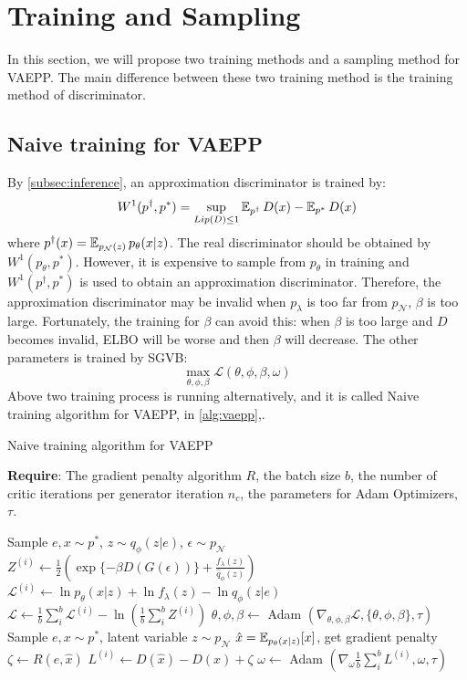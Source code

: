 \section{Training and Sampling}\label{sec:vaepp}
In this section, we will propose two training methods and a sampling method for VAEPP. The main difference between these two training method is the training method of discriminator. 

\subsection{Naive training for VAEPP} \label{subsec:naive_vaepp}
By \cref{subsec:inference}, an approximation discriminator is trained by:
\begin{equation*}
	W^1(p^\dag, p^*) = \sup_{Lip(D) \leq 1} \operatorname{\mathbb{E}}_{p^\dag} D(x) - \operatorname{\mathbb{E}}_{p^*} D(x)
\end{equation*} 
where $p^\dag(x) = \operatorname{\mathbb{E}}_{p_\mathcal{N}(z)} p_\theta(x|z)$. The real discriminator should be obtained by $W^1(p_\theta, p^*)$. However, it is expensive to sample from $p_\theta$ in training and $W^1(p^\dag, p^*)$ is used to obtain an approximation discriminator. Therefore, the approximation discriminator may be invalid when $p_\lambda$ is too far from $p_\mathcal{N}$, \IE $\beta$ is too large. Fortunately, the training for $\beta$ can avoid this: when $\beta$ is too large and $D$ becomes invalid, ELBO will be worse and then $\beta$ will decrease. The other parameters is trained by SGVB:
\begin{equation*}
	\max_{\theta, \phi, \beta} \mathcal{L}(\theta, \phi, \beta, \omega)
\end{equation*}
Above two training process is running alternatively, and it is called Naive training algorithm for VAEPP, in \cref{alg:vaepp},. 
\begin{algorithm}[tb]
\caption{Naive training algorithm for VAEPP}
\label{alg:vaepp}
\textbf{Require}: The gradient penalty algorithm $R$, the batch size $b$, the number of critic iterations per generator iteration $n_c$, the parameters for Adam Optimizers, $\tau$. 

\begin{algorithmic}[1] %
\STATE Sample $e, x \sim p^*$, $z \sim q_\phi(z|e)$, $\epsilon \sim p_\mathcal{N}$
\STATE $Z^{(i)} \gets \frac{1}{2}(\exp\{-\beta D(G(\epsilon))\} + \frac{f_\lambda(z)}{\hat{q}_\phi(z)})$
\STATE $\mathcal{L}^{(i)} \gets \ln p_\theta(x|z) + \ln f_\lambda(z) - \ln q_\phi(z|e)$
\ENDFOR
\STATE $\mathcal{L} \gets \frac{1}{b}\sum_{i}^b \mathcal{L}^{(i)} - \ln (\frac{1}{b}\sum_{i}^b Z^{(i)})$
\STATE $\theta, \phi, \beta \gets $ Adam $(\nabla_{\theta, \phi, \beta} \mathcal{L}, \{\theta, \phi, \beta\}, \tau)$
\ENDFOR
{}
\STATE Sample $e, x \sim p^*$, latent variable $z \sim p_\mathcal{N}$
\STATE	$\hat{x} = \operatorname{\mathbb{E}}_{p_\theta(x|z)}[x]$, get gradient penalty $\zeta \gets R(e, \hat{x})$
\STATE $L^{(i)} \gets D(\hat{x}) - D(x) + \zeta$
\ENDFOR
\STATE $\omega \gets $ Adam $(\nabla_{\omega} \frac{1}{b}\sum_{i}^b L^{(i)}, \omega, \tau)$
\ENDWHILE
\end{algorithmic}
\end{algorithm}

